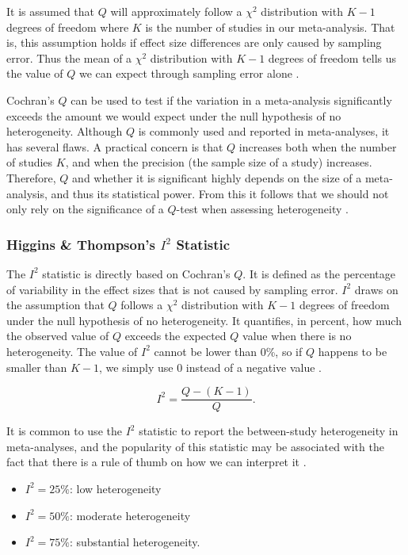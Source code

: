 \documentclass[../../../main.tex]{subfiles}
\begin{document}
It is assumed that $Q$ will approximately follow a $\chi^2$ distribution with $K-1$ degrees of freedom where $K$ is the number of studies in our meta-analysis. That is, this assumption holds if effect size differences are only caused by sampling error. Thus the mean of a $\chi^2$ distribution with $K-1$ degrees of freedom tells us the value of $Q$ we can expect through sampling error alone \autocite{Harrer2021}.

Cochran's $Q$ can be used to test if the variation in a meta-analysis significantly exceeds the amount we would expect under the null hypothesis of no heterogeneity. Although $Q$ is commonly used and reported in meta-analyses, it has several flaws. A practical concern is that $Q$ increases both when the number of studies $K$, and when the precision (the sample size of a study) increases. Therefore, $Q$ and whether it is significant highly depends on the size of a meta-analysis, and thus its statistical power. From this it follows that we should not only rely on the significance of a $Q$-test when assessing heterogeneity \autocite{Harrer2021}.

\subsubsection{Higgins \& Thompson's $I^2$ Statistic}

The $I^2$ statistic is directly based on Cochran's $Q$. It is defined as the percentage of variability in the effect sizes that is not caused by sampling error. $I^2$ draws on the assumption that $Q$ follows a $\chi^2$ distribution with $K-1$ degrees of freedom under the null hypothesis of no heterogeneity. It quantifies, in percent, how much the observed value of $Q$ exceeds the expected $Q$ value when there is no heterogeneity. The value of $I^2$ cannot be lower than 0\%, so if $Q$ happens to be smaller than $K-1$, we simply use 0 instead of a negative value \autocite{Harrer2021}.

\begin{equation}
I^2 = \frac{Q-(K-1)}{Q}.
\end{equation}

It is common to use the $I^2$ statistic to report the between-study heterogeneity in meta-analyses, and the popularity of this statistic may be associated with the fact that there is a rule of thumb on how we can interpret it \autocite{Harrer2021}.

\begin{itemize}
\item $I^2=25\%$: low heterogeneity
\item $I^2=50\%$: moderate heterogeneity
\item $I^2=75\%$: substantial heterogeneity.
\end{itemize}
\end{document}
